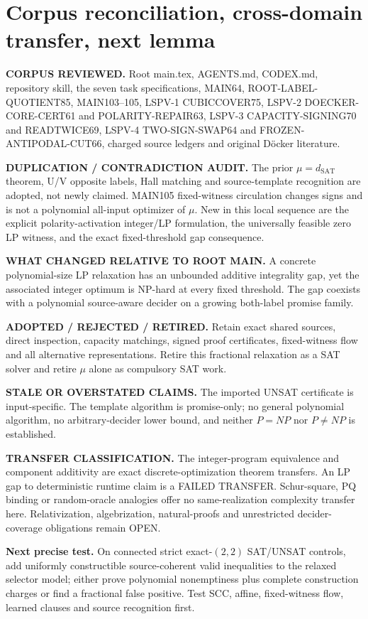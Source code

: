 \documentclass[11pt]{article}
\begin{document}
\section{Corpus reconciliation, cross-domain transfer, next lemma}
\textbf{CORPUS REVIEWED.} Root main.tex, AGENTS.md, CODEX.md, repository skill, the seven task specifications, MAIN64, ROOT-LABEL-QUOTIENT85, MAIN103--105, LSPV-1 CUBICCOVER75, LSPV-2 DOECKER-CORE-CERT61 and POLARITY-REPAIR63, LSPV-3 CAPACITY-SIGNING70 and READTWICE69, LSPV-4 TWO-SIGN-SWAP64 and FROZEN-ANTIPODAL-CUT66, charged source ledgers and original D\"ocker literature.
\par\noindent\textbf{DUPLICATION / CONTRADICTION AUDIT.} The prior $\mu=d_{\mathrm{SAT}}$ theorem, U/V opposite labels, Hall matching and source-template recognition are adopted, not newly claimed. MAIN105 fixed-witness circulation changes signs and is not a polynomial all-input optimizer of $\mu$. New in this local sequence are the explicit polarity-activation integer/LP formulation, the universally feasible zero LP witness, and the exact fixed-threshold gap consequence.
\par\noindent\textbf{WHAT CHANGED RELATIVE TO ROOT MAIN.} A concrete polynomial-size LP relaxation has an unbounded additive integrality gap, yet the associated integer optimum is NP-hard at every fixed threshold. The gap coexists with a polynomial source-aware decider on a growing both-label promise family.
\par\noindent\textbf{ADOPTED / REJECTED / RETIRED.} Retain exact shared sources, direct inspection, capacity matchings, signed proof certificates, fixed-witness flow and all alternative representations. Retire this fractional relaxation as a SAT solver and retire $\mu$ alone as compulsory SAT work.
\par\noindent\textbf{STALE OR OVERSTATED CLAIMS.} The imported UNSAT certificate is input-specific. The template algorithm is promise-only; no general polynomial algorithm, no arbitrary-decider lower bound, and neither $P=NP$ nor $P\ne NP$ is established.
\par\noindent\textbf{TRANSFER CLASSIFICATION.} The integer-program equivalence and component additivity are exact discrete-optimization theorem transfers. An LP gap to deterministic runtime claim is a FAILED TRANSFER. Schur-square, PQ binding or random-oracle analogies offer no same-realization complexity transfer here. Relativization, algebrization, natural-proofs and unrestricted decider-coverage obligations remain OPEN.
\par\noindent\textbf{Next precise test.} On connected strict exact-$(2,2)$ SAT/UNSAT controls, add uniformly constructible source-coherent valid inequalities to the relaxed selector model; either prove polynomial nonemptiness plus complete construction charges or find a fractional false positive. Test SCC, affine, fixed-witness flow, learned clauses and source recognition first.
\end{document}
